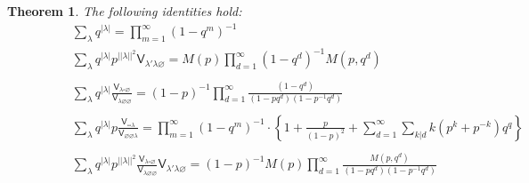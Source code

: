 \documentclass[12pt]{amsart}
\newcommand{\Vsf}{\mathsf{V}}
\newcommand{\bx}{\square}
\renewcommand{\emptyset}{\varnothing}
\newtheorem{theorem}{Theorem}%
\theoremstyle{definition}
\begin{document}
\begin{theorem}\label{thm: main formulas}
The following identities hold:
\begin{align}
&\sum_{\lambda} q^{|\lambda |} = \prod_{m=1}^{\infty} (1-q^{m})^{-1}\label{eqn 1}\\
&\sum_{\lambda} q^{|\lambda |} p^{||\lambda ||^{2}} \Vsf_{\lambda'
\lambda \emptyset }=  M(p) \prod_{d=1}^{\infty} (1-q^{d})^{-1}M(p,q^{d})\label{eqn 2}\\
\quad\nonumber \\
&\sum_{\lambda} q^{|\lambda |}\frac{\Vsf_{\lambda
\bx\emptyset}}{\Vsf_{\lambda \emptyset \emptyset}} =
(1-p)^{-1}\prod_{d=1}^{\infty} \frac{(1-q^{d})}{(1-pq^{d})(1-p^{-1}q^{d})}\label{eqn 3}\\
\quad\nonumber \\
&\sum_{\lambda} q^{|\lambda |} p \frac{\Vsf_{\bx \bx 
\lambda}}{\Vsf_{\emptyset \emptyset \lambda}} =
\prod_{m=1}^{\infty}(1-q^{m})^{-1}\cdot \left\{
1+\frac{p}{(1-p)^{2}}+\sum_{d=1}^{\infty}\sum_{k|d}k(p^{k}+p^{-k})q^{q}\right\}\label{eqn 4}\\
\quad&\quad \nonumber \\
\quad \quad \quad \quad &\sum_{\lambda} q^{|\lambda |} p^{||\lambda ||^{2}}
\frac{\Vsf_{\lambda \bx \emptyset}}{\Vsf_{\lambda \emptyset
\emptyset}}\Vsf_{\lambda' \lambda \emptyset} =
(1-p)^{-1}M(p)\prod_{d=1}^{\infty}
\frac{M(p,q^{d})}{(1-pq^{d})(1-p^{-1}q^{d})}\label{eqn 5}
\end{align}
\end{theorem}
\end{document}
